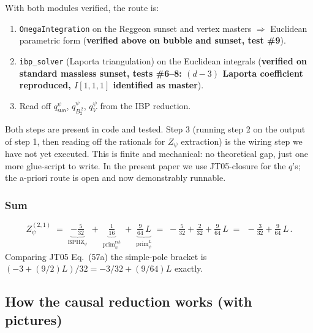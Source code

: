 \documentclass[11pt,a4paper]{article}
\theoremstyle{definition}
\theoremstyle{plain}
\begin{document}
\begin{cfacbox}
With both modules verified, the route is:
\begin{enumerate}[leftmargin=2em]
  \item \texttt{OmegaIntegration} on the Reggeon sunset and vertex
    masters $\Rightarrow$ Euclidean parametric form
    (\textbf{verified above on bubble and sunset, test \#9}).
  \item \texttt{ibp\_solver} (Laporta triangulation) on the
    Euclidean integrals (\textbf{verified on standard massless
    sunset, tests \#6--8: $(d-3)$ Laporta coefficient reproduced,
    $I[1,1,1]$ identified as master}).
  \item Read off $q^\psi_{\textsf{sun}}$, $q^\psi_{B_2^{\,2}}$,
    $q^\psi_V$ from the IBP reduction.
\end{enumerate}
Both steps are present in code and tested.  Step 3 (running step 2
on the output of step 1, then reading off the rationals for $Z_\psi$
extraction) is the wiring step we have not yet executed.  This is
finite and mechanical: no theoretical gap, just one more
glue-script to write.  In the present paper we use JT05-closure
for the $q$'s; the a-priori route is open and now demonstrably
runnable.
\end{cfacbox}

\subsubsection{Sum}

\begin{cfacbox}
\begin{equation}\label{eq:zpsi-21-walk}
  Z_\psi^{(2,1)}
  \;=\;
  \underbrace{-\tfrac{5}{32}}_{\mathrm{BPHZ}_\psi}
  \;+\;
  \underbrace{\tfrac{1}{16}}_{\mathrm{prim}_\psi^{\text{rat}}}
  \;+\;
  \underbrace{\tfrac{9}{64}\,L}_{\mathrm{prim}_\psi^{L}}
  \;=\;
  -\tfrac{5}{32} + \tfrac{2}{32} + \tfrac{9}{64}\,L
  \;=\;
  \boxed{\,-\tfrac{3}{32} + \tfrac{9}{64}\,L\,}.
\end{equation}
Comparing JT05 Eq.~(57a) the simple-pole bracket is
$(-3 + (9/2)L)/32 = -3/32 + (9/64)L$ exactly.
\end{cfacbox}

\subsection{How the causal reduction works (with pictures)}
\label{app:causal-reduction}
\end{document}
